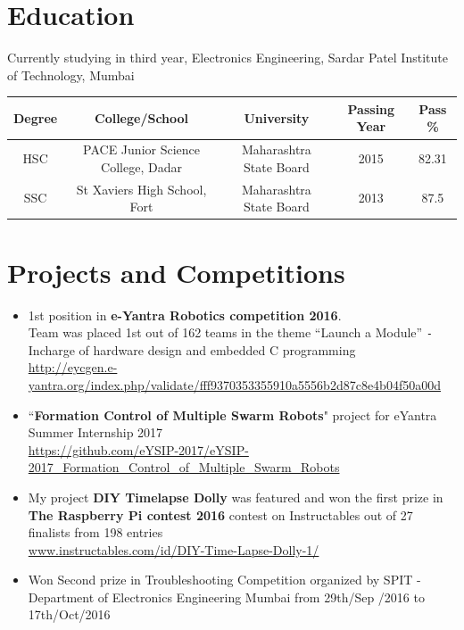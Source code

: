 \documentclass{article}
\begin{document}
	\section*{Education}
	
	Currently studying in third year, Electronics Engineering, Sardar Patel Institute of Technology, Mumbai
	\newline
	\begin{tabular}{|c|c|c|c|c|}
		\hline
		Degree & College/School & University & Passing Year & Pass \% \\
		\hline
		HSC & PACE Junior Science College, Dadar & Maharashtra State Board & 2015 & 82.31\\
		\hline
		SSC & St Xaviers High School, Fort & Maharashtra State Board  & 2013 & 87.5\\
		\hline
	\end{tabular}
	
	\section*{Projects and Competitions}
	\begin{itemize}%
		
		\item 1st position in \textbf{e-Yantra Robotics competition 2016}. \\
		Team was placed 1st out of 162 teams in the theme ``Launch a Module''  
		\verb|-| Incharge of hardware design and embedded C programming\\
		\url{http://eycgen.e-yantra.org/index.php/validate/fff9370353355910a5556b2d87c8e4b04f50a00d}		
		
		\item``\textbf{Formation Control of Multiple Swarm Robots}" project for eYantra Summer Internship 2017\\
		\url{https://github.com/eYSIP-2017/eYSIP-2017_Formation_Control_of_Multiple_Swarm_Robots}
			
		\item My project \textbf{DIY Timelapse Dolly} was featured and won the first prize in \textbf{The Raspberry Pi contest 2016} contest on Instructables out of 27 finalists from 198 entries\\
		\url{www.instructables.com/id/DIY-Time-Lapse-Dolly-1/}
		
		\item Won Second prize in Troubleshooting Competition organized by SPIT - Department of Electronics Engineering Mumbai from 29th/Sep /2016 to 17th/Oct/2016			
	\end{itemize}
		
\end{document}

